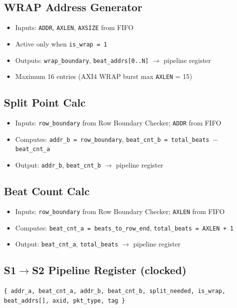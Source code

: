 \subsection{WRAP Address Generator}
\begin{itemize}[noitemsep]
  \item Inputs: \texttt{ADDR}, \texttt{AXLEN}, \texttt{AXSIZE} from FIFO
  \item Active only when \texttt{is\_wrap = 1}
  \item Outputs: \texttt{wrap\_boundary}, \texttt{beat\_addrs[0..N]} $\rightarrow$ pipeline register
  \item Maximum 16 entries (AXI4 WRAP burst max \texttt{AXLEN} = 15)
\end{itemize}

\subsection{Split Point Calc}
\begin{itemize}[noitemsep]
  \item Inputs: \texttt{row\_boundary} from Row Boundary Checker; \texttt{ADDR} from FIFO
  \item Computes: \texttt{addr\_b = row\_boundary}, \texttt{beat\_cnt\_b = total\_beats $-$ beat\_cnt\_a}
  \item Output: \texttt{addr\_b}, \texttt{beat\_cnt\_b} $\rightarrow$ pipeline register
\end{itemize}

\subsection{Beat Count Calc}
\begin{itemize}[noitemsep]
  \item Inputs: \texttt{row\_boundary} from Row Boundary Checker; \texttt{AXLEN} from FIFO
  \item Computes: \texttt{beat\_cnt\_a = beats\_to\_row\_end}, \texttt{total\_beats = AXLEN + 1}
  \item Output: \texttt{beat\_cnt\_a}, \texttt{total\_beats} $\rightarrow$ pipeline register
\end{itemize}

\subsection{S1$\rightarrow$S2 Pipeline Register (clocked)}

\begin{center}
\texttt{\{ addr\_a, beat\_cnt\_a, addr\_b, beat\_cnt\_b, split\_needed, is\_wrap, beat\_addrs[], axid, pkt\_type, tag \}}
\end{center}

